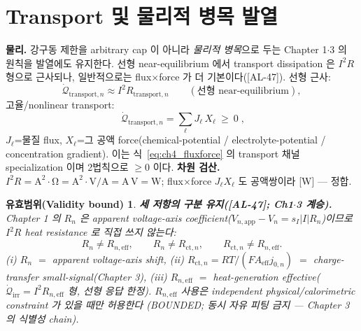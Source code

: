 \documentclass[11pt,a4paper]{article}
\newtheorem*{boundbox}{유효범위(Validity bound)}
\newcommand{\eff}{\mathrm{eff}}
\newcommand{\app}{\mathrm{app}}
\newcommand{\irr}{\mathrm{irr}}
\newcommand{\ct}{\mathrm{ct}}
\newcommand{\transp}{\mathrm{transport}}
\newcommand{\AL}[1]{\textsf{[AL-#1]}}
\begin{document}
\section{Transport 및 물리적 병목 발열}\label{sec:ch4_transport}
\textbf{물리.} 강구동 제한을 arbitrary cap 이 아니라 \emph{물리적 병목}으로 두는 Chapter 1$\cdot$3 의 원칙을
발열에도 유지한다. 선형 near-equilibrium 에서 transport dissipation 은 $I^2R$ 형으로 근사되나, 일반적으로는
flux$\times$force 가 더 기본이다(\AL{47}). 선형 근사:
\begin{equation}
\dot{\mathcal Q}_{\transp,n}\approx I^2 R_{\transp,n}\qquad(\text{선형 near-equilibrium}),
\label{eq:ch4_transport_i2r}
\end{equation}
고율/nonlinear transport:
\begin{equation}
\boxed{\;\dot{\mathcal Q}_{\transp,n}=\sum_\ell J_\ell\,X_\ell\ \ge\ 0\;,}
\label{eq:ch4_transport_ff}
\end{equation}
$J_\ell$=물질 flux, $X_\ell$=그 공액 force(chemical-potential / electrolyte-potential / concentration
gradient). 이는 식~\eqref{eq:ch4_fluxforce} 의 transport 채널 specialization 이며 2법칙으로 $\ge0$ 이다.
\textbf{차원 검산.} $I^2R=\mathrm{A^2\cdot\Omega}=\mathrm{A^2\cdot V/A}=\mathrm{A\,V}=\mathrm W$; flux$\times$force
$J_\ell X_\ell$ 도 공액쌍이라 [W] — 정합.
\begin{boundbox}
\textbf{세 저항의 구분 유지(\AL{47}; Ch1$\cdot$3 계승).} Chapter 1 의 $R_n$ 은 apparent voltage-axis
coefficient($V_{n,\app}-V_n=s_I|I|R_n$)이므로 $I^2R$ heat resistance 로 \emph{직접} 쓰지 않는다:
\begin{equation}
R_n\ne R_{n,\eff},\qquad R_n\ne R_{\ct,n},\qquad R_{\ct,n}\ne R_{n,\eff}.
\label{eq:ch4_Rsep}
\end{equation}
(i) $R_n$ $=$ apparent voltage-axis shift, (ii) $R_{\ct,n}=RT/(FA_\eff j_{0,n})$ $=$ charge-transfer
small-signal(Chapter 3), (iii) $R_{n,\eff}$ $=$ heat-generation effective($\dot{\mathcal Q}_\irr=I^2R_{n,\eff}$
형, 선형 응답 한정). $R_{n,\eff}$ 사용은 independent physical/calorimetric constraint 가 있을 때만 허용한다
(BOUNDED; 동시 자유 피팅 금지 — Chapter 3 의 식별성 chain).
\end{boundbox}

\end{document}
